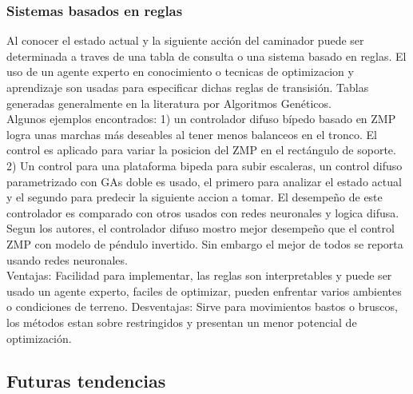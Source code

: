 \documentclass[10pt,onecolumn,twoside,letterpaper]{article}
\begin{document}
\subsubsection{Sistemas basados en reglas}
Al conocer el estado actual y la siguiente acci\'on del caminador puede ser determinada a traves de una tabla de consulta o una sistema basado en reglas. El uso de un agente experto en conocimiento o tecnicas de optimizacion y aprendizaje son usadas para especificar dichas reglas de transisi\'on. Tablas generadas generalmente en la literatura por Algoritmos Gen\'eticos.\cite{Wright2014}\\
Algunos ejemplos encontrados: 1) un controlador difuso b\'ipedo basado en ZMP logra unas marchas m\'as deseables al tener menos balanceos en el tronco. El control es aplicado para variar la posicion del ZMP en el rect\'angulo de soporte. 2) Un control para una plataforma bipeda para subir escaleras, un control difuso parametrizado con GAs doble es usado, el primero para analizar el estado actual y el segundo para predecir la siguiente accion a tomar. El desempe\~no de este controlador es comparado con otros usados con redes neuronales y logica difusa. Segun los autores, el controlador difuso mostro mejor desempe\~no que el control ZMP con modelo de p\'endulo invertido. Sin embargo el mejor de todos se reporta usando redes neuronales.\cite{Wright2014}\\
Ventajas: Facilidad para implementar, las reglas son interpretables y puede ser usado un agente experto, faciles de optimizar, pueden enfrentar varios ambientes o condiciones de terreno. Desventajas: Sirve para movimientos bastos o bruscos, los m\'etodos estan sobre restringidos y presentan un menor potencial de optimizaci\'on.\cite{Wright2014}\\
\subsection{Futuras tendencias}
\end{document}
